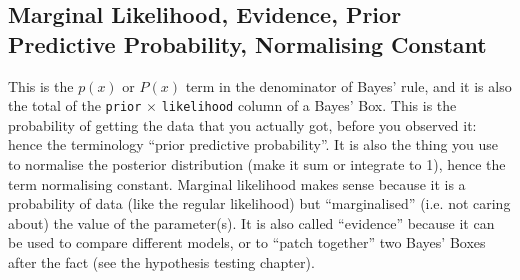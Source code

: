 \subsection*{Marginal Likelihood, Evidence, Prior Predictive Probability, Normalising
Constant}
This is the $p(x)$ or $P(x)$ term in the denominator of Bayes' rule,
and it is also the total of the {\tt prior} $\times$ {\tt likelihood} column
of a Bayes' Box. This is the probability of getting the data that you actually got,
before you observed it: hence the terminology ``prior predictive probability''.
It is also the thing you use to normalise the posterior distribution (make it sum
or integrate to 1), hence the term normalising constant. Marginal likelihood makes
sense because it is a probability of data (like the regular likelihood) but
``marginalised'' (i.e. not caring about) the value of the parameter(s). It is
also called ``evidence'' because it can be used to compare different models, or
to ``patch together'' two Bayes' Boxes after the fact (see the hypothesis testing
chapter).

